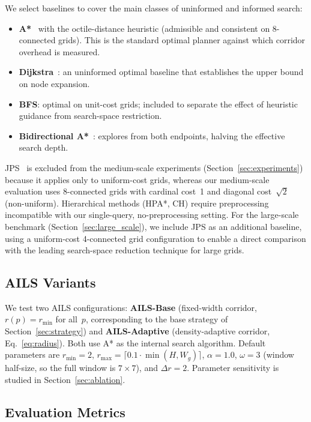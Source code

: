 \documentclass[journal]{IEEEtran}
\begin{document}
We select baselines to cover the main classes of uninformed and informed search:
\begin{itemize}
    \item \textbf{A*}~\cite{hart1968formal} with the octile-distance heuristic (admissible and consistent on 8-connected grids).  This is the standard optimal planner against which corridor overhead is measured.
    \item \textbf{Dijkstra}~\cite{dijkstra1959note}: an uninformed optimal baseline that establishes the upper bound on node expansion.
    \item \textbf{BFS}: optimal on unit-cost grids; included to separate the effect of heuristic guidance from search-space restriction.
    \item \textbf{Bidirectional A*}~\cite{russell2016artificial}: explores from both endpoints, halving the effective search depth.
\end{itemize}
JPS~\cite{harabor2011online} is excluded from the medium-scale experiments (Section~\ref{sec:experiments}) because it applies only to uniform-cost grids, whereas our medium-scale evaluation uses 8-connected grids with cardinal cost~1 and diagonal cost~$\sqrt{2}$ (non-uniform).
Hierarchical methods (HPA*, CH) require preprocessing incompatible with our single-query, no-preprocessing setting.
For the large-scale benchmark (Section~\ref{sec:large_scale}), we include JPS as an additional baseline, using a uniform-cost 4-connected grid configuration to enable a direct comparison with the leading search-space reduction technique for large grids.

\subsection{AILS Variants}

We test two AILS configurations:
\textbf{AILS-Base} (fixed-width corridor, $r(p) = r_{\min}$ for all~$p$, corresponding to the base strategy of Section~\ref{sec:strategy}) and
\textbf{AILS-Adaptive} (density-adaptive corridor, Eq.~\ref{eq:radius}).
Both use A* as the internal search algorithm.
Default parameters are $r_{\min}=2$, $r_{\max} = \lceil 0.1 \cdot \min(H, W_g)\rceil$, $\alpha = 1.0$, $\omega = 3$ (window half-size, so the full window is $7 \times 7$), and $\Delta r = 2$.
Parameter sensitivity is studied in Section~\ref{sec:ablation}.

\subsection{Evaluation Metrics}
\end{document}

